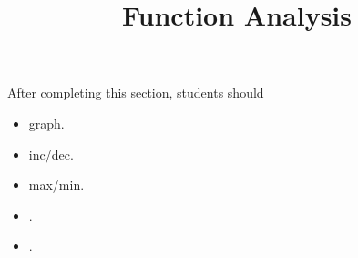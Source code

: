 \documentclass{ximera}
\title{Function Analysis}
\begin{document}
\begin{abstract}
\end{abstract}
\maketitle

\begin{sectionOutcomes}
After completing this section, students should 

\begin{itemize}
\item graph.
\item inc/dec.
\item max/min.
\item .
\item .
\end{itemize}
\end{sectionOutcomes}
\end{document}
